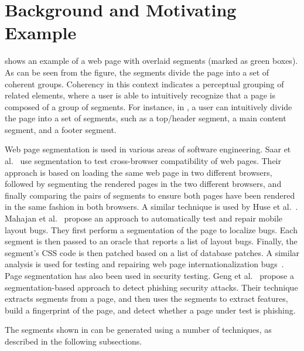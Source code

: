 
\section{Background and Motivating Example}
\label{sec:background}
 shows an example
of a web page with overlaid segments (marked as green boxes).
As can be seen from the figure,
the segments divide the page into a set 
of coherent groups.
Coherency in this context indicates a perceptual grouping of related elements,
where a user is able to intuitively recognize that
a page is composed of a group of segments.
For instance, in ,
a user can intuitively divide the page into 
a set of segments, such as a top/header segment, a main content segment,
and a footer segment. 

Web page segmentation is used in various areas of software engineering.
Saar et al.~\cite{saar2016browserbite}
use segmentation to test
cross-browser compatibility of web pages.
Their approach is based on
loading the same web page in two different browsers,
followed by segmenting the rendered pages in the two different browsers,
and finally comparing the pairs of segments
to ensure both pages have been rendered
in the same fashion in both browsers. 
A similar technique is used by Huse et al.~\cite{huse2008using}.
Mahajan et al.~\cite{mahajan2018automated}
propose an approach to automatically test and repair mobile layout bugs.
They first perform a segmentation of the  page to localize bugs.
Each segment is then passed to an oracle that reports a list of layout bugs.
Finally, the segment's CSS code is then patched based on a list of database patches.
A similar analysis is used for testing and repairing
web page internationalization bugs~\cite{mahajan2018automated_intl}.
Page segmentation has also been used in security testing.
Geng et al.~\cite{geng2015combating} propose a segmentation-based 
approach to detect phishing security attacks.
Their technique extracts segments from a page, and then uses
the segments to extract features, build a fingerprint of the page, 
and detect whether a page under test is phishing.

The segments shown in  can be generated using
a number of techniques, as described in the following subsections.

